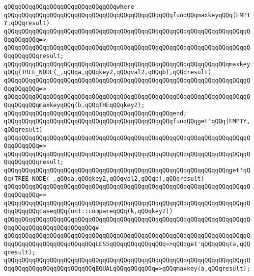 \verb|qQQqqQQqqQQqqQQqqQQqqQQqqQQqqQQqwhere|\newline
\verb|qQQqqQQqqQQqqQQqqQQqqQQqqQQqqQQqqQQqqQQqqQQqqQQqfunqQQqmaxkeyqQQq(EMPTY,qQQqresult)|\newline
\verb|qQQqqQQqqQQqqQQqqQQqqQQqqQQqqQQqqQQqqQQqqQQqqQQqqQQqqQQqqQQqqQQqqQQqqQQqqQQqqQQq=>|\newline
\verb|qQQqqQQqqQQqqQQqqQQqqQQqqQQqqQQqqQQqqQQqqQQqqQQqqQQqqQQqqQQqqQQqqQQqqQQqqQQqqQQqresult;|\newline
\newline
\verb|qQQqqQQqqQQqqQQqqQQqqQQqqQQqqQQqqQQqqQQqqQQqqQQqqQQqqQQqqQQqqQQqmaxkeyqQQq(TREE_NODE(_,qQQqa,qQQqkey2,qQQqval2,qQQqb),qQQqresult)|\newline
\verb|qQQqqQQqqQQqqQQqqQQqqQQqqQQqqQQqqQQqqQQqqQQqqQQqqQQqqQQqqQQqqQQqqQQqqQQqqQQqqQQq=>|\newline
\verb|qQQqqQQqqQQqqQQqqQQqqQQqqQQqqQQqqQQqqQQqqQQqqQQqqQQqqQQqqQQqqQQqqQQqqQQqqQQqqQQqmaxkeyqQQq(b,qQQqTHEqQQqkey2);|\newline
\verb|qQQqqQQqqQQqqQQqqQQqqQQqqQQqqQQqqQQqqQQqqQQqqQQqend;|\newline
\newline
\verb|qQQqqQQqqQQqqQQqqQQqqQQqqQQqqQQqqQQqqQQqqQQqqQQqfunqQQqget'qQQq(EMPTY,qQQqresult)|\newline
\verb|qQQqqQQqqQQqqQQqqQQqqQQqqQQqqQQqqQQqqQQqqQQqqQQqqQQqqQQqqQQqqQQqqQQqqQQqqQQqqQQq=>|\newline
\verb|qQQqqQQqqQQqqQQqqQQqqQQqqQQqqQQqqQQqqQQqqQQqqQQqqQQqqQQqqQQqqQQqqQQqqQQqqQQqqQQqresult;|\newline
\newline
\verb|qQQqqQQqqQQqqQQqqQQqqQQqqQQqqQQqqQQqqQQqqQQqqQQqqQQqqQQqqQQqqQQqget'qQQq(TREE_NODE(_,qQQqa,qQQqkey2,qQQqval2,qQQqb),qQQqresult)|\newline
\verb|qQQqqQQqqQQqqQQqqQQqqQQqqQQqqQQqqQQqqQQqqQQqqQQqqQQqqQQqqQQqqQQqqQQqqQQqqQQqqQQq=>|\newline
\verb|qQQqqQQqqQQqqQQqqQQqqQQqqQQqqQQqqQQqqQQqqQQqqQQqqQQqqQQqqQQqqQQqqQQqqQQqqQQqqQQqcaseqQQq(unt::compareqQQq(k,qQQqkey2))|\newline
\verb|qQQqqQQqqQQqqQQqqQQqqQQqqQQqqQQqqQQqqQQqqQQqqQQqqQQqqQQqqQQqqQQqqQQqqQQqqQQqqQQqqQQqqQQqqQQqqQQq#|\newline
\verb|qQQqqQQqqQQqqQQqqQQqqQQqqQQqqQQqqQQqqQQqqQQqqQQqqQQqqQQqqQQqqQQqqQQqqQQqqQQqqQQqqQQqqQQqqQQqqQQqLESSqQQqqQQqqQQqqQQq=>qQQqget'qQQqqQQq(a,qQQqresult);|\newline
\verb|qQQqqQQqqQQqqQQqqQQqqQQqqQQqqQQqqQQqqQQqqQQqqQQqqQQqqQQqqQQqqQQqqQQqqQQqqQQqqQQqqQQqqQQqqQQqqQQqEQUALqQQqqQQqqQQq=>qQQqmaxkey(a,qQQqresult);|\newline
